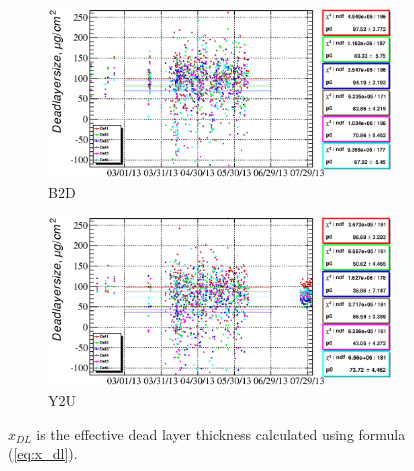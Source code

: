\documentclass[a4paper,12pt]{article}
\begin{document}
\newcommand\xdllabel{$x_{DL}$ is the effective dead layer thickness calculated using formula (\ref{eq:x_dl}).}
\begin{figure}
\begin{subfigure}[b]{0.5\textwidth}
\includegraphics[width=\textwidth]{gfx/run13_alpha_study_novoltagevariation/B2D/c_chDeadLayerSize_by_day_B2D.eps}
\caption{B2D}
\end{subfigure}
%
\begin{subfigure}[b]{0.5\textwidth}
\includegraphics[width=\textwidth]{gfx/run13_alpha_study_novoltagevariation/Y2U/c_chDeadLayerSize_by_day_Y2U.eps}
\caption{Y2U}
\end{subfigure}
\caption{\xdllabel{}}
\label{fig:x_dl}
\end{figure}
\end{document}
